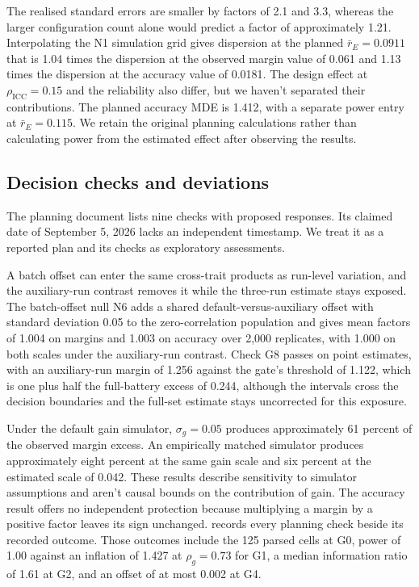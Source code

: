 The realised standard errors are smaller by factors of 2.1 and 3.3, whereas the larger configuration count alone would predict a factor of approximately 1.21. Interpolating the N1 simulation grid gives dispersion at the planned $\bar r_E=0.0911$ that is 1.04 times the dispersion at the observed margin value of 0.061 and 1.13 times the dispersion at the accuracy value of 0.0181. The design effect at $\rho_{\mathrm{ICC}}=0.15$ and the reliability also differ, but we haven't separated their contributions. The planned accuracy MDE is 1.412, with a separate power entry at $\bar r_E=0.115$. We retain the original planning calculations rather than calculating power from the estimated effect after observing the results.

\subsection{Decision checks and deviations}
The planning document lists nine checks with proposed responses. Its claimed date of September 5, 2026 lacks an independent timestamp. We treat it as a reported plan and its checks as exploratory assessments.

A batch offset can enter the same cross-trait products as run-level variation, and the auxiliary-run contrast removes it while the three-run estimate stays exposed. The batch-offset null N6 adds a shared default-versus-auxiliary offset with standard deviation 0.05 to the zero-correlation population and gives mean factors of 1.004 on margins and 1.003 on accuracy over 2,000 replicates, with 1.000 on both scales under the auxiliary-run contrast. Check G8 passes on point estimates, with an auxiliary-run margin of 1.256 against the gate's threshold of 1.122, which is one plus half the full-battery excess of 0.244, although the intervals cross the decision boundaries and the full-set estimate stays uncorrected for this exposure.

Under the default gain simulator, $\sigma_g=0.05$ produces approximately 61 percent of the observed margin excess. An empirically matched simulator produces approximately eight percent at the same gain scale and six percent at the estimated scale of 0.042. These results describe sensitivity to simulator assumptions and aren't causal bounds on the contribution of gain. The accuracy result offers no independent protection because multiplying a margin by a positive factor leaves its sign unchanged.  records every planning check beside its recorded outcome. Those outcomes include the 125 parsed cells at G0, power of 1.00 against an inflation of 1.427 at $\rho_g=0.73$ for G1, a median information ratio of 1.61 at G2, and an offset of at most 0.002 at G4.

